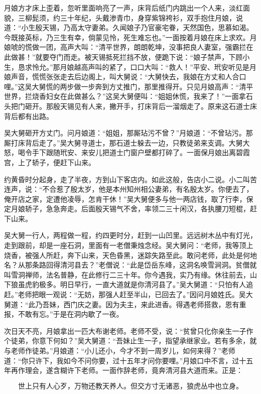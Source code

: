月娘方才床上歪着，忽听里面响亮了一声，床背后纸门内跳出一个人来，淡红面貌，三柳髭须，约三十年纪，头戴渗青巾，身穿紫锦袴衫，双手抱住月娘，说道：“小生殷天锡，乃高太守妻弟。久闻娘子乃官豪宅眷，天然国色，思慕如渴。今既接英标，乃三生有幸，倘蒙见怜，死生难忘也。”一面按着月娘在床上求欢。月娘唬的慌做一团，高声大叫：“清平世界，朗朗乾坤，没事把良人妻室，强霸拦在此做甚！”就要夺门而走。被天锡抵死拦挡不放，便跪下说：“娘子禁声，下顾小生，恳求怜允。”那月娘越高声叫的紧了，口口大叫：“救人！”平安、玳安听见是月娘声音，慌慌张张走去后边阁上，叫大舅说：“大舅快去，我娘在方丈和人合口哩。”这吴大舅慌的两步做一步奔到方丈推门，那里推得开。只见月娘高声：“清平世界，拦烧香妇女在此做甚么？”这吴大舅便叫：“姐姐休慌，我来了！”一面拿石头把门砸开。那殷天锡见有人来，撇开手，打床背后一溜烟走了。原来这石道士床背后都有出路。

吴大舅砸开方丈门。问月娘道：“姐姐，那厮玷污不曾？”月娘道：“不曾玷污。那厮打床背后走了。”吴大舅寻道士，那石道士躲去一边，只教徒弟来支调。大舅大怒，喝令手下跟随玳安、来安儿把道士门窗户壁都打碎了。一面保月娘出离碧霞宫，上了轿子，便赶下山来。

约黄昏时分起身，走了半夜，方到山下客店内。如此这般，告店小二说。小二叫苦连声，说：“不合惹了殷太岁，他是本州知州相公妻弟，有名殷太岁。你便去了，俺开店之家，定遭他凌辱，怎肯干休！”吴大舅便多与他一两店钱，取了行李，保定月娘轿子，急急奔走。后面殷天锡气不舍，率领二三十闲汉，各执腰刀短棍，赶下山来。

吴大舅一行人，两程做一程，约四更时分，赶到一山凹里。远远树木丛中有灯光，走到跟前，却是一座石洞，里面有一老僧秉烛念经。吴大舅问：“老师，我等顶上烧香，被强人所赶，奔下山来，天色昏黑，迷踪失路至此。敢问老师，此处是何地名？从那条路回得清河县去？”老僧说：“此是岱岳东峰，这洞名唤雪涧洞。贫僧就叫雪洞禅师，法名普静，在此修行二三十年。你今遇我，实乃有缘。休往前去，山下狼虽虎豹极多。明日早行，一直大道就是你清河县了。”吴大舅道：“只怕有人追赶。”老师把眼一观说：“无妨，那强人赶至半山，已回去了。”因问月娘姓氏。吴大舅道：“此乃吾妹，西门庆之妻。因为夫主，来此进香。得遇老师搭救，恩有重报，不敢有忘。”于是在洞内歇了一夜。

次日天不亮，月娘拿出一匹大布谢老师。老师不受，说：“贫曾只化你亲生一子作个徒弟，你意下何如？”吴大舅道：“吾妹止生一子，指望承继家业。若有多余，就与老师作徒弟。”月娘道：“小儿还小，今才不到一周岁儿，如何来得？”老师道：“你只许下，我如今不问你要，过十五年才问你要哩。”月娘口中不言，过十五年再作理会，遂含糊许下老师。一面作辞老师，竟奔清河县大道而来。正是：

\[
世上只有人心歹，万物还教天养人。
但交方寸无诸恶，狼虎丛中也立身。
\]
